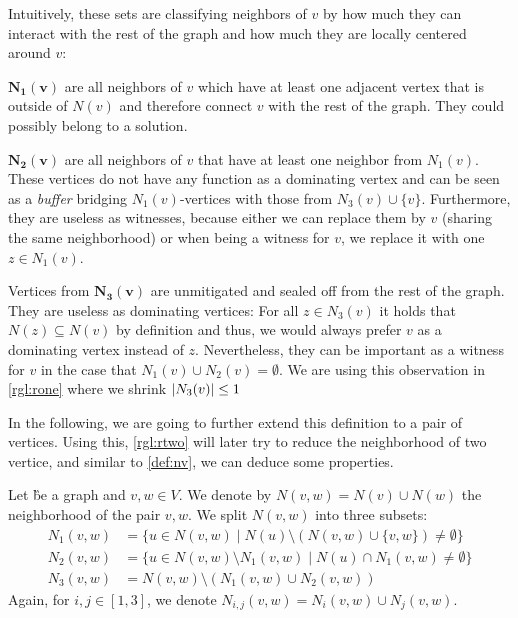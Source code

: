 Intuitively, these sets are classifying neighbors of $v$ by how much they can interact with the rest of the graph and how much they are locally centered around $v$:

\noindent \textbf{$\mathbf{N_1(v)}$} are all neighbors of $v$ which have at least one adjacent vertex that is outside of $N(v)$ and therefore connect $v$ with the rest of the graph. They could possibly belong to a solution.

\noindent \textbf{$\mathbf{N_2(v)}$} are all neighbors of $v$ that have at least one neighbor from $N_1(v)$. These vertices do not have any function as a dominating vertex and can be seen as a \textit{buffer} bridging $N_1(v)$-vertices with those from $N_3(v) \cup \{ v \}$. Furthermore, they are useless as witnesses, because either we can replace them by $v$ (sharing the same neighborhood) or when being a witness for $v$, we replace it with one $z \in N_1(v)$.

\noindent Vertices from $\mathbf{N_3(v)}$ are unmitigated and sealed off from the rest of the graph. They are useless as dominating vertices: For all $z \in N_3(v)$ it holds that  $N(z) \subseteq N(v)$ by definition and thus, we would always prefer $v$ as a dominating vertex instead of $z$. Nevertheless, they can be important as a witness for $v$ in the case that $N_1(v) \cup N_2(v) =\emptyset $. We are using this observation in \cref{rgl:rone} where we shrink $\abs{N_3(v)} \leq 1$

In the following, we are going to further extend this definition to a pair of vertices. Using this, \cref{rgl:rtwo} will later try to reduce the neighborhood of two vertice, and similar to \ref{def:nv}, we can deduce some properties.

\begin{definition}
    Let \G be a graph and $v,w \in V$. We denote by $N(v,w) = N(v) \cup N(w)$ the neighborhood of the pair $v,w$. We split $N(v,w)$ into three subsets:
    \begin{align}
        N_1(v,w) & = \{u \in N(v,w) \mid N(u) \setminus (N(v,w)\cup \{v,w\}) \neq \emptyset \}  \\
        N_2(v,w) & = \{u \in N(v,w)\setminus N_1(v,w) \mid N(u) \cap N_1(v,w) \neq \emptyset \} \\
        N_3(v,w) & =  N(v,w) \setminus (N_1(v,w) \cup N_2(v,w))
    \end{align}
    Again, for $i,j \in [1,3]$, we denote $N_{i,j}(v,w) = N_i(v,w) \cup N_j(v,w)$.
\end{definition}

